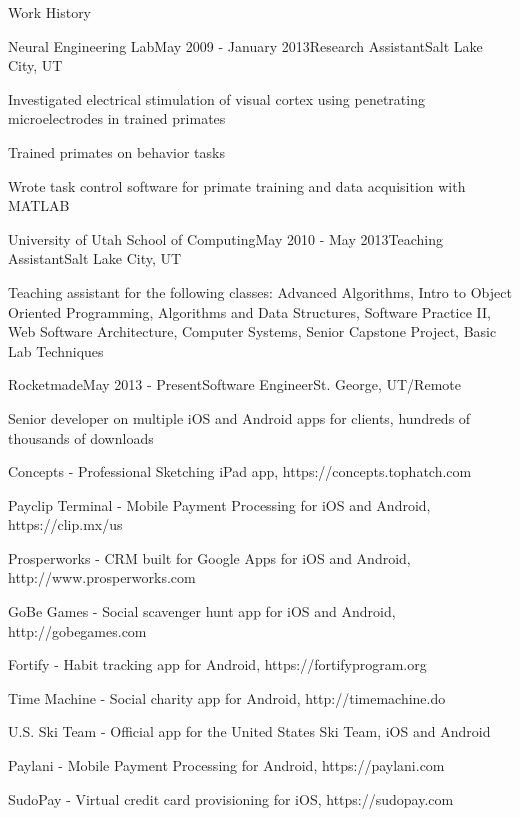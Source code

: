 \documentclass{resume} %
\begin{document}
\begin{rSection}{Work History}


\begin{rSubsection}{Neural Engineering Lab}{May 2009 - January 2013}{Research Assistant}{Salt Lake City, UT}
\item Investigated electrical stimulation of visual cortex using penetrating microelectrodes in trained primates
\item Trained primates on behavior tasks
\item Wrote task control software for primate training and data acquisition with MATLAB
\end{rSubsection}


\begin{rSubsection}{University of Utah School of Computing}{May 2010 - May 2013}{Teaching Assistant}{Salt Lake City, UT}
\item Teaching assistant for the following classes: Advanced Algorithms, Intro to Object Oriented Programming, Algorithms and Data Structures, Software Practice II, Web Software Architecture, Computer Systems, Senior Capstone Project, Basic Lab Techniques
\end{rSubsection}



\begin{rSubsection}{Rocketmade}{May 2013 - Present}{Software Engineer}{St. George, UT/Remote}
\item Senior developer on multiple iOS and Android apps for clients, hundreds of thousands of downloads
\item Concepts - Professional Sketching iPad app, https://concepts.tophatch.com
\item Payclip Terminal - Mobile Payment Processing for iOS and Android, https://clip.mx/us
\item Prosperworks - CRM built for Google Apps for iOS and Android, http://www.prosperworks.com
\item GoBe Games - Social scavenger hunt app for iOS and Android, http://gobegames.com
\item Fortify - Habit tracking app for Android, https://fortifyprogram.org
\item Time Machine - Social charity app for Android, http://timemachine.do
\item U.S. Ski Team - Official app for the United States Ski Team, iOS and Android
\item Paylani - Mobile Payment Processing for Android, https://paylani.com
\item SudoPay - Virtual credit card provisioning for iOS, https://sudopay.com
\end{rSubsection}

\end{rSection}
\end{document}

